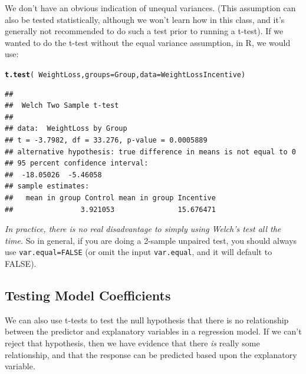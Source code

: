 \documentclass[twoside]{book}\usepackage[]{graphicx}\usepackage[]{xcolor}
\makeatletter
\newcommand{\hlopt}[1]{\textcolor[rgb]{0,0,0}{#1}}%
\newcommand{\hlstd}[1]{\textcolor[rgb]{0.345,0.345,0.345}{#1}}%
\newcommand{\hlkwc}[1]{\textcolor[rgb]{0.333,0.667,0.333}{#1}}%
\newcommand{\hlkwd}[1]{\textcolor[rgb]{0.737,0.353,0.396}{\textbf{#1}}}%
\newenvironment{kframe}{%
 \def\at@end@of@kframe{}%
 \ifinner\ifhmode%
  \def\at@end@of@kframe{\end{minipage}}%
  \begin{minipage}{\columnwidth}%
 \fi\fi%
 \def\FrameCommand##1{\hskip\@totalleftmargin \hskip-\fboxsep
 \colorbox{shadecolor}{##1}\hskip-\fboxsep
     \hskip-\linewidth \hskip-\@totalleftmargin \hskip\columnwidth}%
 \MakeFramed {\advance\hsize-\width
   \@totalleftmargin\z@ \linewidth\hsize
   \@setminipage}}%
 {\par\unskip\endMakeFramed%
 \at@end@of@kframe}
\newenvironment{knitrout}{}{} %
\makeatother
\begin{document}
We don't have an obvious indication of unequal variances. (This assumption can also be tested statistically, although we won't learn how in this class, and it's generally not recommended to do such a test prior to running a t-test).  If we wanted to do the t-test without the equal variance assumption, in R, we would use:
\begin{knitrout}
\color{fgcolor}\begin{kframe}
\begin{alltt}
\hlkwd{t.test}\hlstd{(}\hlopt{~}\hlstd{WeightLoss,} \hlkwc{groups} \hlstd{= Group,} \hlkwc{data} \hlstd{= WeightLossIncentive)}
\end{alltt}
\begin{verbatim}
## 
## 	Welch Two Sample t-test
## 
## data:  WeightLoss by Group
## t = -3.7982, df = 33.276, p-value = 0.0005889
## alternative hypothesis: true difference in means is not equal to 0
## 95 percent confidence interval:
##  -18.05026  -5.46058
## sample estimates:
##   mean in group Control mean in group Incentive 
##                3.921053               15.676471
\end{verbatim}
\end{kframe}
\end{knitrout}

\emph{In practice, there is no real disadvantage to simply using Welch's test all the time.}  So in general, if you are doing a 2-sample unpaired test, you should always use \texttt{var.equal=FALSE} (or omit the input \texttt{var.equal}, and it will default to FALSE).


\subsection{Testing Model Coefficients}

We can also use t-tests to test the null hypothesis that there is no relationship between the predictor and explanatory variables in a regression model.  If we can't reject that hypothesis, then we have evidence that there \emph{is} really some relationship, and that the response can be predicted based upon the explanatory variable.
\end{document}
